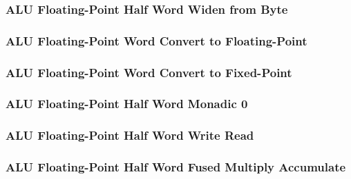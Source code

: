 \subsubsection[{\small ALU Floating-Point Half Word Widen from Byte}]{ALU Floating-Point Half Word Widen from Byte} \label{sec:format-ALU-FHWIDEN}



\subsubsection[{\small ALU Floating-Point Word Convert to Floating-Point}]{ALU Floating-Point Word Convert to Floating-Point} \label{sec:format-ALU-FHFLOAT}



\subsubsection[{\small ALU Floating-Point Word Convert to Fixed-Point}]{ALU Floating-Point Word Convert to Fixed-Point} \label{sec:format-ALU-FHFIXED}



\subsubsection[{\small ALU Floating-Point Half Word Monadic 0}]{ALU Floating-Point Half Word Monadic 0} \label{sec:format-ALU-FHMO0}



\subsubsection[{\small ALU Floating-Point Half Word Write Read}]{ALU Floating-Point Half Word Write Read} \label{sec:format-ALU-FHWR}



\subsubsection[{\small ALU Floating-Point Half Word Fused Multiply Accumulate}]{ALU Floating-Point Half Word Fused Multiply Accumulate} \label{sec:format-ALU-FHFMA}

